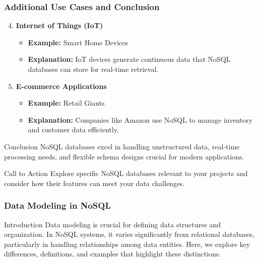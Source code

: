 \documentclass[aspectratio=169]{beamer}
\begin{document}
\begin{frame}[fragile]
    \frametitle{Additional Use Cases and Conclusion}
    \begin{enumerate}
        \setcounter{enumi}{3} %
        \item \textbf{Internet of Things (IoT)}
        \begin{itemize}
            \item \textbf{Example:} Smart Home Devices
            \item \textbf{Explanation:} IoT devices generate continuous data that NoSQL databases can store for real-time retrieval.
        \end{itemize}

        \item \textbf{E-commerce Applications}
        \begin{itemize}
            \item \textbf{Example:} Retail Giants
            \item \textbf{Explanation:} Companies like Amazon use NoSQL to manage inventory and customer data efficiently.
        \end{itemize}
    \end{enumerate}

    \begin{block}{Conclusion}
        NoSQL databases excel in handling unstructured data, real-time processing needs, and flexible schema designs crucial for modern applications.
    \end{block}
    
    \begin{block}{Call to Action}
        Explore specific NoSQL databases relevant to your projects and consider how their features can meet your data challenges.
    \end{block}
\end{frame}

\begin{frame}
    \frametitle{Data Modeling in NoSQL}
    \begin{block}{Introduction}
        Data modeling is crucial for defining data structures and organization. In NoSQL systems, it varies significantly from relational databases, particularly in handling relationships among data entities. Here, we explore key differences, definitions, and examples that highlight these distinctions.
    \end{block}
\end{frame}
\end{document}
